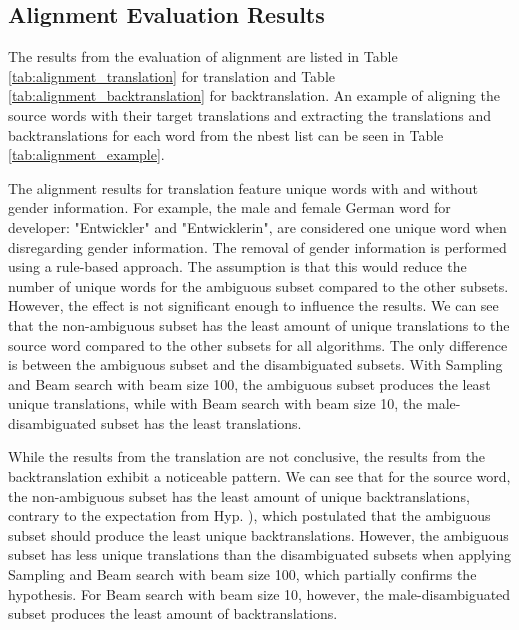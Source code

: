 \clearpage

\subsection{Alignment Evaluation Results}
\label{ch:Base_Experiment:Results:Alignment}

The results from the evaluation of alignment are listed in Table \ref{tab:alignment_translation} for translation and Table \ref{tab:alignment_backtranslation} for backtranslation. An example of aligning the source words with their target translations and extracting the translations and backtranslations for each word from the nbest list can be seen in Table \ref{tab:alignment_example}.


The alignment results for translation feature unique words with and without gender information. For example, the male and female German word for developer: "Entwickler" and "Entwicklerin", are considered one unique word when disregarding gender information. The removal of gender information is performed using a rule-based approach. The assumption is that this would reduce the number of unique words for the ambiguous subset compared to the other subsets. However, the effect is not significant enough to influence the results. We can see that the non-ambiguous subset has the least amount of unique translations to the source word compared to the other subsets for all algorithms. The only difference is between the ambiguous subset and the disambiguated subsets. With Sampling and Beam search with beam size 100, the ambiguous subset produces the least unique translations, while with Beam search with beam size 10, the male-disambiguated subset has the least translations.

While the results from the translation are not conclusive, the results from the backtranslation exhibit a noticeable pattern. We can see that for the source word, the non-ambiguous subset has the least amount of unique backtranslations, contrary to the expectation from Hyp. ), which postulated that the ambiguous subset should produce the least unique backtranslations. However, the ambiguous subset has less unique translations than the disambiguated subsets when applying Sampling and Beam search with beam size 100, which partially confirms the hypothesis. For Beam search with beam size 10, however, the male-disambiguated subset produces the least amount of backtranslations.

